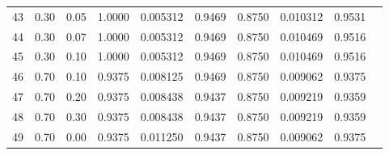 \begin{tabular}{r r r r r r r r r l}
43 & 0.30 & 0.05 & 1.0000 & 0.005312 & 0.9469 & 0.8750 & 0.010312 & 0.9531 &  \\
44 & 0.30 & 0.07 & 1.0000 & 0.005312 & 0.9469 & 0.8750 & 0.010469 & 0.9516 &  \\
45 & 0.30 & 0.10 & 1.0000 & 0.005312 & 0.9469 & 0.8750 & 0.010469 & 0.9516 &  \\
46 & 0.70 & 0.10 & 0.9375 & 0.008125 & 0.9469 & 0.8750 & 0.009062 & 0.9375 &  \\
47 & 0.70 & 0.20 & 0.9375 & 0.008438 & 0.9437 & 0.8750 & 0.009219 & 0.9359 &  \\
48 & 0.70 & 0.30 & 0.9375 & 0.008438 & 0.9437 & 0.8750 & 0.009219 & 0.9359 &  \\
49 & 0.70 & 0.00 & 0.9375 & 0.011250 & 0.9437 & 0.8750 & 0.009062 & 0.9375 &  \\
\bottomrule
\end{tabular}
